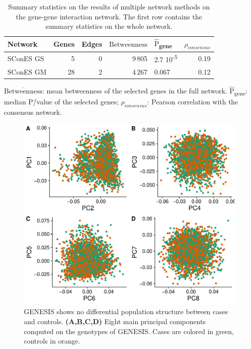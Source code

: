 \documentclass[twocolumn, 11pt]{article}
\newcommand{\mean}[1]{$\overline{\mbox{#1}}$}
\newcommand{\median}[1]{$\hat{\mbox{#1}}$}
\begin{document}
\begin{table}[htbp]
\begin{threeparttable}
  \caption{Summary statistics on the results of multiple network methods on the gene-gene interaction network. The first row contains the summary statistics on the whole network.}
\label{tab:scones_gene_solutions}
\centering
\begin{tabular}{lrrrlr}
Network & Genes & Edges & \mean{Betweenness} & \median{P}\textsubscript{gene} & $\rho_{consensus}$\\
\hline
SConES GS & 5 & 0 & 9\,805 & 2.7 \texttimes{} 10\textsuperscript{-5} & 0.19\\
SConES GM & 28 & 2 & 4\,267 & 0.067 & 0.12\\
\end{tabular}
\begin{tablenotes}
  \footnotesize{
    \item \mean{Betweenness}: mean betweenness of the selected genes in the full network. \median{P}\textsubscript{gene}: median P\=/value of the selected genes; $\rho_{consensus}$: Pearson correlation with the consensus network.
  }
\end{tablenotes}
\end{threeparttable}
\end{table}

\begin{figure}[htbp]
\centering
\includegraphics[width=.9\linewidth]{./figures/sfigure_1.pdf}
\caption{GENESIS shows no differential population structure between cases and controls. \textbf{(A,B,C,D)} Eight main principal components computed on the genotypes of GENESIS. Cases are colored in green, controls in orange.}
\label{sfig:pcs}
\end{figure}
\end{document}
